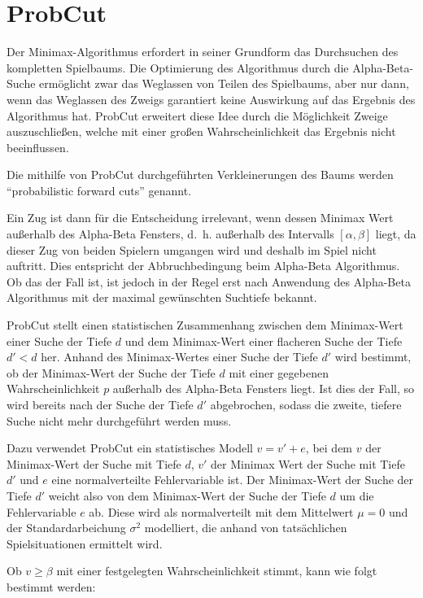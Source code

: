 \section{ProbCut}

Der Minimax-Algorithmus erfordert in seiner Grundform das Durchsuchen des kompletten Spielbaums. Die Optimierung des
Algorithmus durch die Alpha-Beta-Suche ermöglicht zwar das Weglassen von Teilen des Spielbaums, aber nur dann, wenn das
Weglassen des Zweigs garantiert keine Auswirkung auf das Ergebnis des Algorithmus hat. ProbCut erweitert diese Idee
durch die Möglichkeit Zweige auszuschließen, welche mit einer großen Wahrscheinlichkeit das Ergebnis nicht beeinflussen.

Die mithilfe von ProbCut durchgeführten Verkleinerungen des Baums werden "`probabilistic forward cuts"' genannt.

Ein Zug ist dann für die Entscheidung irrelevant, wenn dessen Minimax Wert außerhalb des Alpha-Beta Fensters, d. h.
außerhalb des Intervalls \([\alpha,\beta]\) liegt, da dieser Zug von beiden Spielern umgangen wird und deshalb im Spiel
nicht auftritt. Dies entspricht der Abbruchbedingung beim Alpha-Beta Algorithmus. Ob das der Fall ist, ist jedoch in der
Regel erst nach Anwendung des Alpha-Beta Algorithmus mit der maximal gewünschten Suchtiefe bekannt.

ProbCut stellt einen statistischen Zusammenhang zwischen dem Minimax-Wert einer Suche der Tiefe \(d\) und dem
Minimax-Wert einer flacheren Suche der Tiefe \(d'<d\) her. Anhand des Minimax-Wertes einer Suche der Tiefe \(d'\) wird
bestimmt, ob der Minimax-Wert der Suche der Tiefe \(d\) mit einer gegebenen Wahrscheinlichkeit \(p\) außerhalb des
Alpha-Beta Fensters liegt. Ist dies der Fall, so wird bereits nach der Suche der Tiefe \(d'\) abgebrochen, sodass die
zweite, tiefere Suche nicht mehr durchgeführt werden muss.

Dazu verwendet ProbCut ein statistisches Modell \(v=v'+e\), bei dem \(v\) der Minimax-Wert der Suche mit Tiefe \(d\),
\(v'\) der Minimax Wert der Suche mit Tiefe \(d'\) und \(e\) eine normalverteilte Fehlervariable ist. Der Minimax-Wert
der Suche der Tiefe \(d'\) weicht also von dem Minimax-Wert der Suche der Tiefe \(d\) um die Fehlervariable \(e\) ab.
Diese wird als normalverteilt mit dem Mittelwert $\mu=0$ und der Standardarbeichung \(\sigma^2\) modelliert, die anhand
von tatsächlichen Spielsituationen ermittelt wird.

Ob $v\geq\beta$ mit einer festgelegten Wahrscheinlichkeit stimmt, kann wie folgt bestimmt werden:

